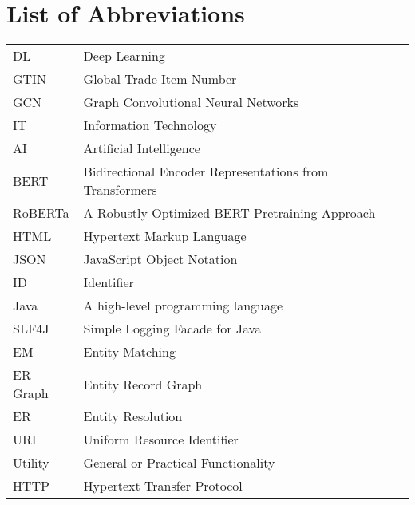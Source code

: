 \chapter*{List of Abbreviations}
\vspace{0.65cm}

\begin{table*}[htbp]
    \begin{tabular}{ll}
        DL & Deep Learning \\
        GTIN & Global Trade Item Number \\
        GCN & Graph Convolutional Neural Networks \\
        IT & Information Technology \\
        AI & Artificial Intelligence \\
        BERT & Bidirectional Encoder Representations from Transformers \\
        RoBERTa & A Robustly Optimized BERT Pretraining Approach \\
        HTML & Hypertext Markup Language \\
        JSON & JavaScript Object Notation \\
        ID & Identifier \\
        Java & A high-level programming language \\
        SLF4J & Simple Logging Facade for Java \\
        EM & Entity Matching \\
        ER-Graph & Entity Record Graph \\
        ER & Entity Resolution \\
        URI & Uniform Resource Identifier \\
        Utility & General or Practical Functionality \\
        HTTP & Hypertext Transfer Protocol \\
    \end{tabular}
\end{table*}
